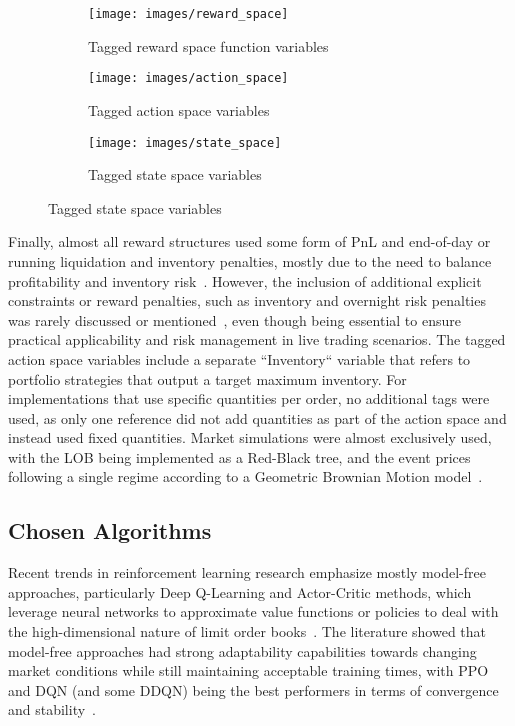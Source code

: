 \begin{figure}
    \centering
    \begin{subfigure}{1\columnwidth}
        \centering
        \texttt{[image: images/reward\_space]}
        \caption{Tagged reward space function variables}
        \label{fig:figure3}
    \end{subfigure}
    \vspace{0.5em}
    \begin{subfigure}{1\columnwidth}
        \centering
        \texttt{[image: images/action\_space]}
        \caption{Tagged action space variables}
        \label{fig:figure2}
    \end{subfigure}
    \vspace{0.5em} %
    \begin{subfigure}{1\columnwidth}
        \centering
        \texttt{[image: images/state\_space]}
        \caption{Tagged state space variables}
        \label{fig:figure1}
    \end{subfigure}
\end{figure}

Finally, almost all reward structures used some form of PnL and end-of-day or running liquidation and inventory penalties, mostly due to the need to balance profitability and inventory risk~\cite{Sun2022, Gasperov2021}.
However, the inclusion of additional explicit constraints or reward penalties, such as inventory and overnight risk penalties was rarely discussed or mentioned~\citep{Jerome2022a, Selser2021a, Sun2022},
even though being essential to ensure practical applicability and risk management in live trading scenarios.
The tagged action space variables include a separate ``Inventory`` variable that refers to portfolio strategies that output a target maximum inventory.
For implementations that use specific quantities per order, no additional tags were used, as only one reference did not add quantities as part of the action space and instead used fixed quantities.
Market simulations were almost exclusively used, with the LOB being implemented as a Red-Black tree,
and the event prices following a single regime according to a Geometric Brownian Motion model~\cite{Gasperov2021, Sun2022}.

\subsection{Chosen Algorithms}
\label{subsec:chosen-algorithms}
Recent trends in reinforcement learning research emphasize mostly model-free approaches, particularly Deep Q-Learning and Actor-Critic methods,
which leverage neural networks to approximate value functions or policies to deal with the high-dimensional nature of limit order books~\cite{Patel2018, Ganesh2019}.
The literature showed that model-free approaches had strong adaptability capabilities towards changing market conditions
while still maintaining acceptable training times, with PPO and DQN (and some DDQN) being the best performers in terms of convergence and stability~\cite{Sun2022, Gasperov2021a}.

